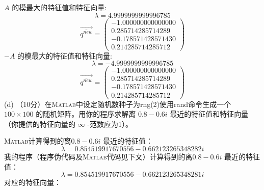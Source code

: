 \documentclass[12pt,a4paper,UTF8]{ctexart}
\begin{document}
\begin{enumerate}
          $A$ 的模最大的特征值和特征向量:
          \begin{equation}
              \lambda = 4.9999999999996785
          \end{equation}
          \begin{equation}
              \overrightarrow{\overline{q^{new}} }=\left(\begin{array}{c}
                      -1.000000000000000 \\
                      0.285714285714289  \\
                      -0.178571428571430 \\
                      0.214285714285712
                  \end{array}\right)
          \end{equation}
          $-A$ 的模最大的特征值和特征向量:
          \begin{equation}
              \lambda = -4.9999999999996785
          \end{equation}
          \begin{equation}
              \overrightarrow{\overline{q^{new}} }=\left(\begin{array}{c}
                      -1.000000000000000 \\
                      0.285714285714289  \\
                      -0.178571428571430 \\
                      0.214285714285712
                  \end{array}\right)
          \end{equation}
          (d) （10分）在\textsc{Matlab}中设定随机数种子为rng(2)使用rand命令生成一个 $100 \times 100$ 的随机矩阵。用你的程序求解离 $0.8-0.6 i$ 最近的特征值和特征向量（你提供的特征向量的 $\infty$ -范数应为1）。

          \textsc{Matlab}计算得到的离$0.8-0.6 i$ 最近的特征值：
          \begin{equation}
              \lambda = 0.854519917670556 - 0.662123265348282i
          \end{equation}
          我的程序（程序伪代码及\textsc{Matlab}代码见下文）计算得到的离$0.8-0.6 i$ 最近的特征值：
          \begin{equation}
              \lambda = 0.854519917670556 - 0.662123265348281i
          \end{equation}
          对应的特征向量：

          \begin{longtable}{c}


\end{longtable}
\end{enumerate}
\end{document}

